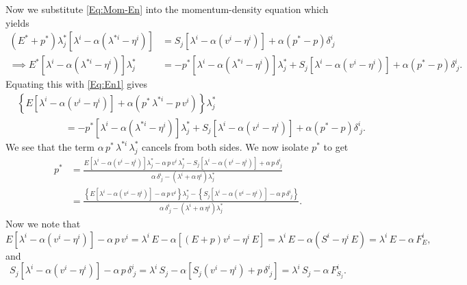 \documentclass[10pt,preprint]{../aastex}
\begin{document}
Now we substitute \eqref{Eq:Mom-En} into the momentum-density equation which yields
\begin{align}
\left(E^{*}+p^{*}\right)\lambda^{*}_{j}\left[\lambda^{i}-\alpha\left(\lambda^{*i}-\eta^{i}\right)\right]&=S_{j}\left[\lambda^{i}-\alpha\left(v^{i}-\eta^{i}\right)\right]+\alpha\left(p^{*}-p\right)\delta^{i}_{~j}\\
\implies E^{*}\left[\lambda^{i}-\alpha\left(\lambda^{*i}-\eta^{i}\right)\right]\lambda^{*}_{j}&=-p^{*}\left[\lambda^{i}-\alpha\left(\lambda^{*i}-\eta^{i}\right)\right]\lambda^{*}_{j}+S_{j}\left[\lambda^{i}-\alpha\left(v^{i}-\eta^{i}\right)\right]+\alpha\left(p^{*}-p\right)\delta^{i}_{~j}.
\end{align}
Equating this with \eqref{Eq:En1} gives
\begin{align}
&\left\{E\left[\lambda^{i}-\alpha\left(v^{i}-\eta^{i}\right)\right]+\alpha\left(p^{*}\,\lambda^{*i}-p\,v^{i}\right)\right\}\lambda^{*}_{j}\\
&\hspace{5em}=-p^{*}\left[\lambda^{i}-\alpha\left(\lambda^{*i}-\eta^{i}\right)\right]\lambda^{*}_{j}+S_{j}\left[\lambda^{i}-\alpha\left(v^{i}-\eta^{i}\right)\right]+\alpha\left(p^{*}-p\right)\delta^{i}_{~j}.
\end{align}
We see that the term $\alpha\,p^{*}\,\lambda^{*i}\,\lambda^{*}_{j}$ cancels from both sides. We now isolate $p^{*}$ to get
\begin{align}
p^{*}&=\frac{E\left[\lambda^{i}-\alpha\left(v^{i}-\eta^{i}\right)\right]\lambda^{*}_{j}-\alpha\,p\,v^{i}\,\lambda^{*}_{j}-S_{j}\left[\lambda^{i}-\alpha\left(v^{i}-\eta^{i}\right)\right]+\alpha\,p\,\delta^{i}_{~j}}{\alpha\,\delta^{i}_{~j}-\left(\lambda^{i}+\alpha\,\eta^{i}\right)\lambda^{*}_{j}}\\
&=\frac{\left\{E\left[\lambda^{i}-\alpha\left(v^{i}-\eta^{i}\right)\right]-\alpha\,p\,v^{i}\right\}\lambda^{*}_{j}-\left\{S_{j}\left[\lambda^{i}-\alpha\left(v^{i}-\eta^{i}\right)\right]-\alpha\,p\,\delta^{i}_{~j}\right\}}{\alpha\,\delta^{i}_{~j}-\left(\lambda^{i}+\alpha\,\eta^{i}\right)\lambda^{*}_{j}}.
\end{align}
Now we note that
\begin{equation}
E\left[\lambda^{i}-\alpha\left(v^{i}-\eta^{i}\right)\right]-\alpha\,p\,v^{i}=\lambda^{i}\,E-\alpha\left[\left(E+p\right)v^{i}-\eta^{i}\,E\right]=\lambda^{i}\,E-\alpha\left(S^{i}-\eta^{i}\,E\right)=\lambda^{i}\,E-\alpha\,F^{i}_{E},
\end{equation}
and
\begin{equation}
S_{j}\left[\lambda^{i}-\alpha\left(v^{i}-\eta^{i}\right)\right]-\alpha\,p\,\delta^{i}_{~j}=\lambda^{i}\,S_{j}-\alpha\left[S_{j}\left(v^{i}-\eta^{i}\right)+p\,\delta^{i}_{~j}\right]=\lambda^{i}\,S_{j}-\alpha\,F^{i}_{S_{j}}.
\end{equation}
\end{document}
